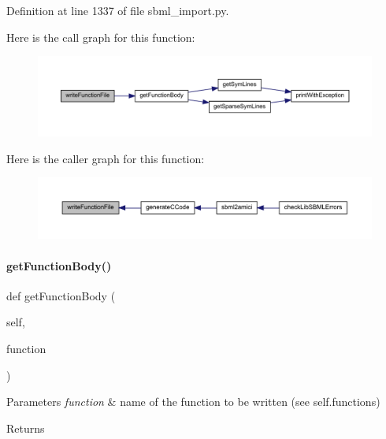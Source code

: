 Definition at line 1337 of file sbml\+\_\+import.\+py.

Here is the call graph for this function\+:
\nopagebreak
\begin{figure}[H]
\begin{center}
\leavevmode
\includegraphics[width=350pt]{classamici_1_1sbml__import_1_1_sbml_importer_a85e1499fa29b10b4a0b4afc82feec4e9_cgraph}
\end{center}
\end{figure}
Here is the caller graph for this function\+:
\nopagebreak
\begin{figure}[H]
\begin{center}
\leavevmode
\includegraphics[width=350pt]{classamici_1_1sbml__import_1_1_sbml_importer_a85e1499fa29b10b4a0b4afc82feec4e9_icgraph}
\end{center}
\end{figure}
\mbox{\label{classamici_1_1sbml__import_1_1_sbml_importer_a500fe2b103c67fe14f16d7076a114029}} 
\paragraph{\texorpdfstring{get\+Function\+Body()}{getFunctionBody()}}
{\footnotesize\ttfamily def get\+Function\+Body (\begin{DoxyParamCaption}\item[{}]{self,  }\item[{}]{function }\end{DoxyParamCaption})}


\begin{DoxyParams}{Parameters}
{\em function} & name of the function to be written (see self.\+functions)\\
\hline
\end{DoxyParams}
\begin{DoxyReturn}{Returns}

\end{DoxyReturn}


